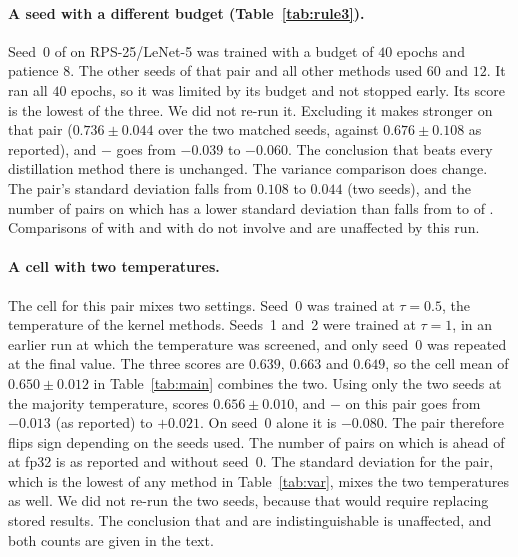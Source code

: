 \paragraph{A \Scratch seed with a different budget (Table~\ref{tab:rule3}).}
Seed~0 of \Scratch on RPS-25/LeNet-5 was trained with a budget of $40$ epochs and patience $8$. The other seeds of that pair and all other methods used $60$ and $12$.
It ran all $40$ epochs, so it was limited by its budget and not stopped early. Its score is the lowest of the three.
We did not re-run it.
Excluding it makes \Scratch stronger on that pair ($0.736\pm0.044$ over the two matched seeds, against $0.676\pm0.108$ as reported), and \Pqk $-$ \Scratch goes from $-0.039$ to $-0.060$. The conclusion that \Scratch beats every distillation method there is unchanged.
The variance comparison does change. The pair's \Scratch standard deviation falls from $0.108$ to $0.044$ (two seeds), and the number of pairs on which \Pqk has a lower standard deviation than \Scratch falls from \VarBelowScratch{} to \VarBelowScratchEx{} of \NPairs{}.
Comparisons of \Pqk with \Rbf and with \Kd do not involve \Scratch and are unaffected by this run.

\paragraph{A \Kd cell with two temperatures.}
The \Kd cell for this pair mixes two settings. Seed~0 was trained at $\tau=0.5$, the temperature of the kernel methods. Seeds~1 and~2 were trained at $\tau=1$, in an earlier run at which the temperature was screened, and only seed~0 was repeated at the final value.
The three scores are $0.639$, $0.663$ and $0.649$, so the cell mean of $0.650\pm0.012$ in Table~\ref{tab:main} combines the two.
Using only the two seeds at the majority temperature, \Kd scores $0.656\pm0.010$, and \Pqk $-$ \Kd on this pair goes from $-0.013$ (as reported) to $+0.021$. On seed~0 alone it is $-0.080$.
The pair therefore flips sign depending on the seeds used. The number of pairs on which \Pqk is ahead of \Kd at fp32 is \KdAheadFp{} as reported and \KdAheadFpEx{} without seed~0.
The \Kd standard deviation for the pair, which is the lowest of any method in Table~\ref{tab:var}, mixes the two temperatures as well.
We did not re-run the two seeds, because that would require replacing stored results. The conclusion that \Pqk and \Kd are indistinguishable is unaffected, and both counts are given in the text.

\begin{table}[t]
  \centering
  \caption{The recipe audit. $^{\S}$Run trained with a different budget and patience from the rest of its pair.}
  \label{tab:rule3}
\end{table}

